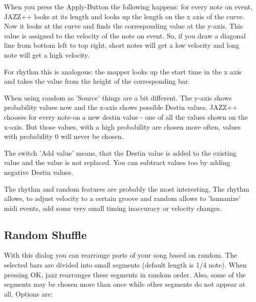 \documentclass[letterpaper]{report}
\begin{document}
When you press the Apply-Button
the following happens: for every note on event, JAZZ++ looks at its length and
looks up the length on the x axis of the curve. Now it looks at the curve and
finds the corresponding value at the y-axis. This value is assigned to the
velocity of the note on event. So, if you draw a diagonal line from bottom
left to top right, short notes will get a low velocity and long note will get
a high velocity.

For rhythm this is analogous: the mapper looks up the start time in the x axis
and takes the value from the height of the corresponding bar.

When using random as 'Source' things are a bit different. The y-axis shows
probability values now and the x-axis shows possible Destin values.
JAZZ++ chooses for every note-on a new destin value - one of all the values
shown on the x-axis. But those values, with a high probability are chosen
more often, values with probability 0 will never be chosen.

The switch 'Add value' means, that the Destin value is added to the existing
value and the value is not replaced. You can subtract values too by adding
negative Destin values.

The rhythm and random features are probably the most interesting. The rhythm
allows, to adjust velocity to a certain groove and random allows to 'humanize'
midi events, add some very small timing inaccuracy or velocity changes.



\subsection{Random Shuffle}\label{shuffle}


With this dialog you can rearrange parts of your song based on random. The
selected bars are divided into small segments (default length is 1/4 note).
When pressing OK, jazz rearranges these segments in random order. Also,
some of the segments may be chosen more than once while other segments do
not appear at all. Options are:
\end{document}

